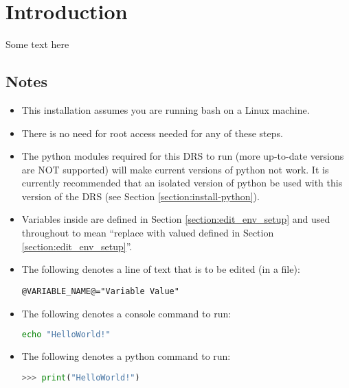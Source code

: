 \chapter{Introduction}

Some text here

\section{Notes}
\begin{itemize}
\item This installation assumes you are running bash on a Linux machine.

\item There is no need for root access needed for any of these steps.

\item The python modules required for this DRS to run (more up-to-date versions are NOT supported) will make current versions of python not work. It is currently recommended that an isolated version of python be used with this version of the DRS (see Section \ref{section:install-python}).

\item Variables inside  are defined in Section \ref{section:edit_env_setup} and used throughout to mean ``replace with valued defined in Section \ref{section:edit_env_setup}''.

\item The following denotes a line of text that is to be edited (in a file):

\begin{lstlisting}[style=text]
@VARIABLE_NAME@="Variable Value"
\end{lstlisting}

\item The following denotes a console command to run:

\begin{lstlisting}[language=bash, style=bashstyle]
echo "HelloWorld!"
\end{lstlisting}


\item The following denotes a python command to run:


\begin{lstlisting}[language=Python, style=pythonstyle]
>>> print("HelloWorld!")
\end{lstlisting}

\end{itemize}